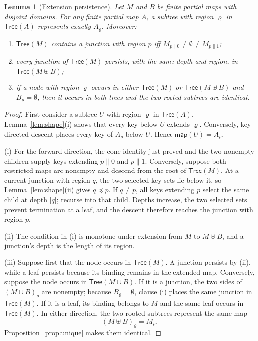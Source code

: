 \documentclass[twocolumn]{article}
\newtheorem{lemma}{Lemma}
\begin{document}
\begin{lemma}[Extension persistence]
\label{lem:persist}
Let $M$ and $B$ be finite partial maps with disjoint domains.
For any finite partial map $A$, a subtree with region $\varrho$ in
$\mathsf{Tree}(A)$ represents exactly $A_\varrho$. Moreover:
\begin{enumerate}[nosep,label=(\roman*)]
  \item $\mathsf{Tree}(M)$ contains a junction with region $p$ iff $M_{p\|0} \neq \emptyset \neq M_{p\|1}$;
  \item every junction of $\mathsf{Tree}(M)$ persists, with the same depth and region, in $\mathsf{Tree}(M \uplus B)$;
  \item if a node with region $\varrho$ occurs in either $\mathsf{Tree}(M)$ or $\mathsf{Tree}(M \uplus B)$ and $B_\varrho = \emptyset$, then it occurs in both trees and the two rooted subtrees are identical.
\end{enumerate}
\end{lemma}
\begin{proof}
First consider a subtree $U$ with region $\varrho$ in $\mathsf{Tree}(A)$. Lemma~\ref{lem:shape}(i) shows that every key below $U$ extends $\varrho$. Conversely, key-directed descent places every key of $A_\varrho$ below $U$. Hence $\mathsf{map}(U)=A_\varrho$.

(i) For the forward direction, the cone identity just proved and the two nonempty children supply keys extending $p\|0$ and $p\|1$. Conversely, suppose both restricted maps are nonempty and descend from the root of $\mathsf{Tree}(M)$. At a current junction with region $q$, the two selected key sets lie below it, so Lemma~\ref{lem:shape}(ii) gives $q \preceq p$. If $q \neq p$, all keys extending $p$ select the same child at depth $|q|$; recurse into that child. Depths increase, the two selected sets prevent termination at a leaf, and the descent therefore reaches the junction with region $p$.

(ii) The condition in (i) is monotone under extension from $M$ to $M \uplus B$, and a junction's depth is the length of its region.

(iii) Suppose first that the node occurs in $\mathsf{Tree}(M)$. A junction persists by (ii), while a leaf persists because its binding remains in the extended map. Conversely, suppose the node occurs in $\mathsf{Tree}(M \uplus B)$. If it is a junction, the two sides of $(M \uplus B)_\varrho$ are nonempty; because $B_\varrho=\emptyset$, clause (i) places the same junction in $\mathsf{Tree}(M)$. If it is a leaf, its binding belongs to $M$ and the same leaf occurs in $\mathsf{Tree}(M)$. In either direction, the two rooted subtrees represent the same map
\[
  (M \uplus B)_\varrho=M_\varrho.
\]
Proposition~\ref{prop:unique} makes them identical.
\end{proof}
\end{document}
